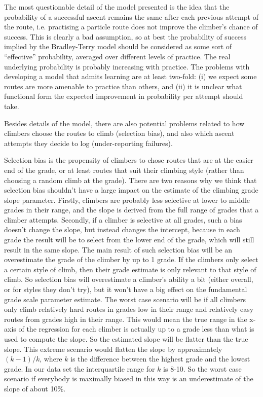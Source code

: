 \documentclass{article}
\begin{document}
The most questionable detail of the model presented is the idea that the probability of a successful ascent remains the same after each previous attempt of the route, i.e. practising a particle route does not improve the climber's chance of success. This is clearly a bad assumption, so at best the probability of success implied by the Bradley-Terry model should be considered as some sort of ``effective'' probability, averaged over different levels of practice. The real underlying probability is probably increasing with practice. The problems with developing a model that admits learning are at least two-fold: (i) we expect some routes are more amenable to practice than others, and (ii) it is unclear what functional form the expected improvement in probability per attempt should take.

Besides details of the model, there are also potential problems related to how climbers choose the routes to climb (selection bias), and also which ascent attempts they decide to log (under-reporting failures). 

Selection bias is the propensity of climbers to chose routes that are at the easier end of the grade, or at least routes that suit their climbing style (rather than choosing a random climb at the grade). There are two reasons why we think that selection bias shouldn't have a large impact on the estimate of the climbing grade slope parameter. Firstly, climbers are probably less selective at lower to middle grades in their range, and the slope is derived from the full range of grades that a climber attempts. Secondly, if a climber is selective at all grades, such a bias doesn't change the slope, but instead changes the intercept, because in each grade the result will be to select from the lower end of the grade, which will still result in the same slope. The main result of such selection bias will be an overestimate the grade of the climber by up to 1 grade. If the climbers only select a certain style of climb, then their grade estimate is only relevant to that style of climb. So selection bias will overestimate a climber's ability a bit (either overall, or for styles they don't try), but it won't have a big effect on the fundamental grade scale parameter estimate. The worst case scenario will be if all climbers only climb relatively hard routes in grades low in their range and relatively easy routes from grades high in their range. This would mean the true range in the x-axis of the regression for each climber is actually up to a grade less than what is used to compute the slope. So the estimated slope will be flatter than the true slope. This extreme scenario would flatten the slope by approximately $(k-1)/k$, where $k$ is the difference between the highest grade and the lowest grade. In our data set the interquartile range for $k$ is 8-10. So the worst case scenario if everybody is maximally biased in this way is an underestimate of the slope of about 10\%.  
\end{document}
